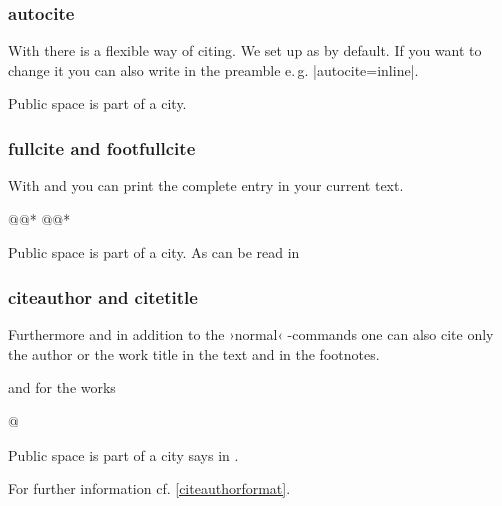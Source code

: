 \documentclass[a4paper,
10pt,
greek,
french,
spanish,
italian,
ngerman,
english
]{ltxdoc}
\begin{document}
\subsubsection{autocite}

\DescribeMacro{\autocite}
With  there is a flexible way of citing. 
We set up  as  by default.
If you want to change it you can also write in the preamble e.\,g. |autocite=inline|.

\begin{example}
Public space is part of a city.\autocite{Osland2016} 
\end{example}

\subsubsection{fullcite and footfullcite}
\DescribeMacro{\fullcite}\DescribeMacro{\footfullcite}
With  and  you can print the complete entry in your current text.
\begin{code}
\fullcite*@@*
\footfullcite*@@*
\end{code} 

\begin{example}
Public space is part of a city.
As can be read in 
\end{example}


\subsubsection{citeauthor and citetitle}

\DescribeMacro{\citeauthor}
\DescribeMacro{\citetitle}\label{citeauthor}%
Furthermore and in addition to the ›normal‹ -commands one can also cite only the author or the work title in the text and in the footnotes.
  and for the works 
\begin{code}
\citetitle*@%
\end{code} 

\begin{example}
Public space is part of a city says \citeauthor{Osland2016} in .
\end{example}
For further information cf. \cref{citeauthorformat}.
\end{document}
